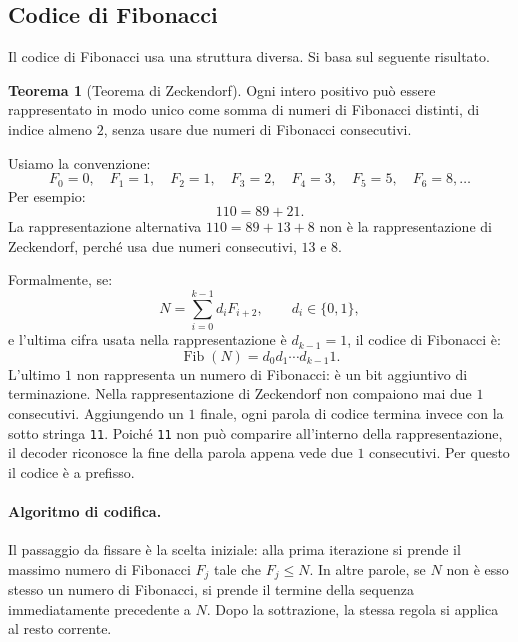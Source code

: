\documentclass{article}
\theoremstyle{definition}
\newtheorem{theorem}{Teorema}[section] %
\numberwithin{equation}{section}
\begin{document}
\subsection{Codice di Fibonacci}
Il codice di Fibonacci usa una struttura diversa. Si basa sul seguente risultato.

\begin{theorem}[Teorema di Zeckendorf]
    Ogni intero positivo può essere rappresentato in modo unico come somma di numeri di Fibonacci distinti, di indice almeno $2$, senza usare due numeri di Fibonacci consecutivi.
\end{theorem}

Usiamo la convenzione:
\[
    F_0=0,\quad
    F_1=1,\quad
    F_2=1,\quad
    F_3=2,\quad
    F_4=3,\quad
    F_5=5,\quad
    F_6=8,\ldots
\]
Per esempio:
\[
    110=89+21.
\]
La rappresentazione alternativa $110=89+13+8$ non è la rappresentazione di Zeckendorf, perché usa due numeri consecutivi, $13$ e $8$.

Formalmente, se:
\begin{equation}\label{eq:zeckendorf_representation}
    N=\sum_{i=0}^{k-1} d_i F_{i+2},
    \qquad d_i\in\{0,1\},
\end{equation}
e l'ultima cifra usata nella rappresentazione è $d_{k-1}=1$, il codice di Fibonacci è:
\begin{equation}\label{eq:fibonacci_code}
    \operatorname{Fib}(N)=d_0d_1\cdots d_{k-1}1.
\end{equation}
L'ultimo $1$ non rappresenta un numero di Fibonacci: è un bit aggiuntivo di terminazione.
Nella rappresentazione di Zeckendorf non compaiono mai due $1$ consecutivi. Aggiungendo un $1$ finale, ogni parola di codice termina invece con la sotto stringa \texttt{11}. Poiché \texttt{11} non può comparire all'interno della rappresentazione, il decoder riconosce la fine della parola appena vede due $1$ consecutivi. Per questo il codice è a prefisso.

\paragraph{Algoritmo di codifica.}
Il passaggio da fissare è la scelta iniziale: alla prima iterazione si prende il massimo numero di Fibonacci $F_j$ tale che $F_j\leq N$. In altre parole, se $N$ non è esso stesso un numero di Fibonacci, si prende il termine della sequenza immediatamente precedente a $N$. Dopo la sottrazione, la stessa regola si applica al resto corrente.
\end{document}
